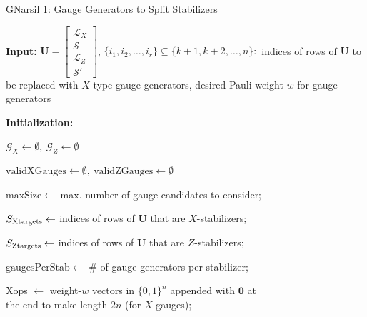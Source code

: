 \documentclass[conference]{IEEEtran}
\begin{document}




\begin{algorithm}
\caption{GNarsil 1: Gauge Generators to Split Stabilizers}
\label{alg:euclid}

\begin{algorithmic}[1]


\State \textbf{Input:} $\boldsymbol{U} = 
\begin{bmatrix}
    \mathcal{L}_{X} \\
    \mathcal{S} \\
    \mathcal{L}_{Z}\\
    \mathcal{S'}
\end{bmatrix}$, $\{ i_1, i_2, \ldots, i_r \} \subseteq \{ k+1, k+2, \ldots, n \}:$ indices of rows of $\boldsymbol{U}$ to be replaced with $X$-type gauge generators, desired Pauli weight $w$ for gauge generators

\State \textbf{Initialization:} 



$\mathcal{G}_X \gets \emptyset, \ \mathcal{G}_Z \gets \emptyset$

$\mathrm{validXGauges} \gets \emptyset, \ \mathrm{validZGauges} \gets \emptyset$



$\mathrm{maxSize} \gets $ max. number of gauge candidates to consider; 

$S_{\rm Xtargets} \gets$ indices of rows of $\boldsymbol{U}$ that are $X$-stabilizers; 

$S_{\rm Ztargets} \gets$ indices of rows of $\boldsymbol{U}$ that are $Z$-stabilizers; 

$\mathrm{gaugesPerStab} \gets $ \# of gauge generators per stabilizer; 

Xops $\gets$ weight-$w$ vectors in $\{0,1\}^{n}$ appended with $\boldsymbol{0}$ at\\ \hspace{1.75cm} the end to make length $2n$ (for $X$-gauges); 


\end{algorithmic}
\end{algorithm}
\end{document}
